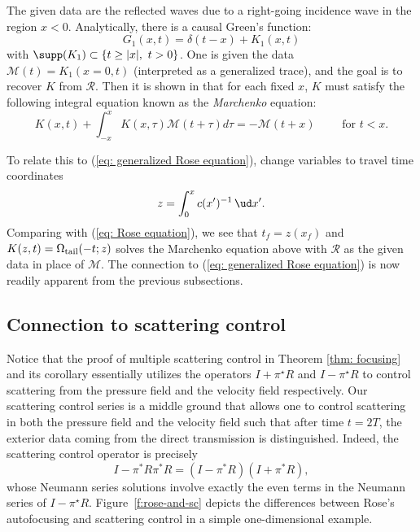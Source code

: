 \documentclass[10pt]{article}
\theoremstyle{plain}
\theoremstyle{definition}
\theoremstyle{remark}
\numberwithin{theorem}{section}
\numberwithin{example}{section}
\numberwithin{equation}{section}
\numberwithin{figure}{section}
\def\beq{\begin{equation} }
\def\eeq{\end{equation}}
\def \R{\mathcal{R}}
\def \M{ \mathcal{M}}
\newcommand\tail{_{\textup{tail}}}
\begin{document}
 The given data are the reflected waves due to a right-going incidence wave in the region $x <0$. Analytically, there is a causal Green's function:
 $$G_1(x,t) = \delta(t-x) + K_1(x,t)$$
 with $\supp(K_1) \subset \{ t \geq |x|, \ t >0\}$. One is given the data $\M(t) = K_1(x=0,t)$ (interpreted as a generalized trace), and the goal is to recover $K$ from $\R$. Then it is shown in \cite[Section 3]{Bur80} that for each fixed $x$, $K$ must satisfy the following integral equation known as the \emph{Marchenko} equation:
 \beq{
  K(x,t) + \int_{-x}^xK(x,\tau) \M(t+ \tau) d\tau =-\M(t+x)  \qquad \text{ for } t<x.
 }\eeq

To relate this to (\ref{eq: generalized Rose equation}), change variables to travel time coordinates
$$ z = \int_0^x c(x')^{-1}\,\ud x'.$$
Comparing with (\ref{eq: Rose equation}), we see that $t_f = z(x_f)$ and $K(z,t) = \Omega\tail(-t;z)$ solves the Marchenko equation above with $\R$ as the given data in place of $\M$. The connection to (\ref{eq: generalized Rose equation}) is now readily apparent from the previous subsections.

\subsection{Connection to scattering control}
Notice that the proof of multiple scattering control in Theorem \ref{thm: focusing} and its corollary essentially utilizes the operators $I+ \pi^\star R$ and $I-\pi^\star R$ to control scattering from the pressure field and the velocity field respectively.
Our scattering control series is a middle ground that allows one to control scattering in both the pressure field and the velocity field such that after time $t=2T$, the exterior data coming from the direct transmission is distinguished. Indeed, the scattering control operator is precisely
$$ I - \pi^*R\pi^*R = (I-\pi^*R)(I+\pi^*R),$$
whose Neumann series solutions involve exactly the even terms in the Neumann series of $I-\pi^\star R$.
%
Figure~\ref{f:rose-and-sc} depicts the differences between Rose's autofocusing and scattering control in a simple one-dimensional example.
\end{document}
